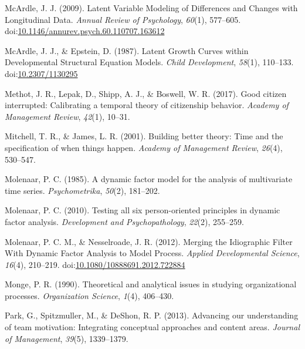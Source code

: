\documentclass[english,,man]{apa6}
\theoremstyle{definition}
\theoremstyle{definition}
\theoremstyle{definition}
\theoremstyle{remark}
\begin{document}
\leavevmode\hypertarget{ref-mcardle_latent_2009}{}%
McArdle, J. J. (2009). Latent Variable Modeling of Differences and
Changes with Longitudinal Data. \emph{Annual Review of Psychology},
\emph{60}(1), 577--605.
doi:\href{https://doi.org/10.1146/annurev.psych.60.110707.163612}{10.1146/annurev.psych.60.110707.163612}

\leavevmode\hypertarget{ref-mcardle_latent_1987}{}%
McArdle, J. J., \& Epstein, D. (1987). Latent Growth Curves within
Developmental Structural Equation Models. \emph{Child Development},
\emph{58}(1), 110--133.
doi:\href{https://doi.org/10.2307/1130295}{10.2307/1130295}

\leavevmode\hypertarget{ref-methot2017good}{}%
Methot, J. R., Lepak, D., Shipp, A. J., \& Boswell, W. R. (2017). Good
citizen interrupted: Calibrating a temporal theory of citizenship
behavior. \emph{Academy of Management Review}, \emph{42}(1), 10--31.

\leavevmode\hypertarget{ref-mitchell_building_2001}{}%
Mitchell, T. R., \& James, L. R. (2001). Building better theory: Time
and the specification of when things happen. \emph{Academy of Management
Review}, \emph{26}(4), 530--547.

\leavevmode\hypertarget{ref-molenaar_dynamic_1985}{}%
Molenaar, P. C. (1985). A dynamic factor model for the analysis of
multivariate time series. \emph{Psychometrika}, \emph{50}(2), 181--202.

\leavevmode\hypertarget{ref-molenaar_testing_2010}{}%
Molenaar, P. C. (2010). Testing all six person-oriented principles in
dynamic factor analysis. \emph{Development and Psychopathology},
\emph{22}(2), 255--259.

\leavevmode\hypertarget{ref-molenaar_merging_2012}{}%
Molenaar, P. C. M., \& Nesselroade, J. R. (2012). Merging the
Idiographic Filter With Dynamic Factor Analysis to Model Process.
\emph{Applied Developmental Science}, \emph{16}(4), 210--219.
doi:\href{https://doi.org/10.1080/10888691.2012.722884}{10.1080/10888691.2012.722884}

\leavevmode\hypertarget{ref-monge_theoretical_1990}{}%
Monge, P. R. (1990). Theoretical and analytical issues in studying
organizational processes. \emph{Organization Science}, \emph{1}(4),
406--430.

\leavevmode\hypertarget{ref-park2013advancing}{}%
Park, G., Spitzmuller, M., \& DeShon, R. P. (2013). Advancing our
understanding of team motivation: Integrating conceptual approaches and
content areas. \emph{Journal of Management}, \emph{39}(5), 1339--1379.
\end{document}
